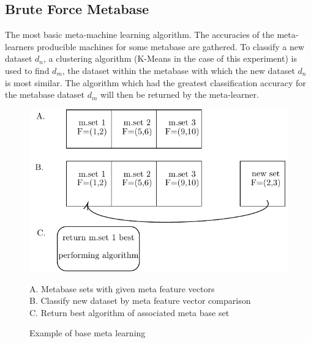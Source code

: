 \subsection{Brute Force Metabase}
The most basic meta-machine learning algorithm. The accuracies of the
meta-learners producible machines for some metabase are gathered. To classify
a new dataset $d_n$, a clustering algorithm (K-Means in the case of this experiment) is
used to find $d_m$, the dataset within the metabase with which the new dataset $d_n$ is
most similar. The algorithm which had the greatest classification accuracy for
the metabase dataset $d_m$ will then be returned by the meta-learner.
\begin{figure}[h]
\includegraphics{Chapters/Images/BaseLearner/BaseLearner.pdf}
\caption{Example of base meta learning}
\centering
A. Metabase sets with given meta feature vectors \\
B. Classify new dataset by meta feature vector comparison \\
C. Return best algorithm of associated meta base set
\end{figure}
